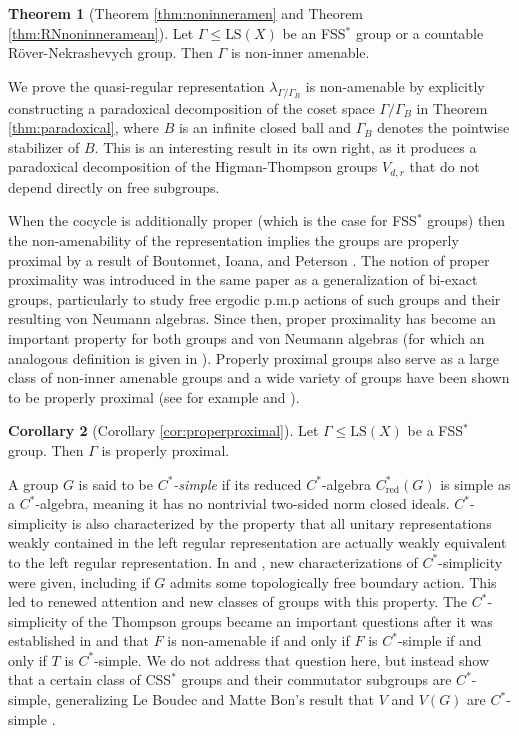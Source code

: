 \documentclass[12pt]{amsart}
\numberwithin{equation}{subsection}
\theoremstyle{definition}
\newtheorem{introthm}{Theorem}
\newtheorem{introcor}[introthm]{Corollary}
\theoremstyle{definition}
\theoremstyle{remark}
\begin{document}
 

\begin{introthm}[Theorem \ref{thm:noninneramen} and Theorem \ref{thm:RNnoninneramean}]\label{MainThm:NonInner}
    Let $\Gamma \leq \text{LS}(X)$ be an FSS$^*$ group or a countable R\"{o}ver-Nekrashevych group. Then $\Gamma$ is non-inner amenable.
\end{introthm}


We prove the quasi-regular representation $\lambda_{\Gamma / \Gamma_B}$ is non-amenable by explicitly constructing a paradoxical decomposition of the coset space $\Gamma/\Gamma_B$ in Theorem \ref{thm:paradoxical}, where $B$ is an infinite closed ball and $\Gamma_{B}$ denotes the pointwise stabilizer of $B$. This is an interesting result in its own right, as it produces a paradoxical decomposition of the Higman-Thompson groups $V_{d,r}$ that do not depend directly on free subgroups. 

When the cocycle is additionally proper (which is the case for FSS$^*$ groups) then the non-amenability of the representation implies the groups are properly proximal by a result of Boutonnet, Ioana, and Peterson \cite{boutonnet2021properly}. The notion of proper proximality was introduced in the same paper as a generalization of bi-exact groups, particularly to study free ergodic p.m.p actions of such groups and their resulting von Neumann algebras. Since then, proper proximality has become an important property for both groups and von Neumann algebras (for which an analogous definition is given in \cite{ding2022properly}). Properly proximal groups also serve as a large class of non-inner amenable groups and a wide variety of groups have been shown to be properly proximal (see for example \cite{ding2021ProperProximality} and \cite{horbez2023proper}). 



\begin{introcor}[Corollary \ref{cor:properproximal}]\label{MainThmPropP}
     Let $\Gamma \leq \text{LS}(X)$ be a FSS$^*$ group. Then $\Gamma$ is properly proximal.
\end{introcor}

A group $G$ is said to be \emph{$C^*$-simple} if its reduced $C^*$-algebra $C^*_{\text{red}}(G)$ is simple as a $C^*$-algebra, meaning it has no nontrivial two-sided norm closed ideals. $C^*$-simplicity is also characterized by the property that all unitary representations weakly contained in the left regular representation are actually weakly equivalent to the left regular representation. In \cite{KalantarKennedy2016} and \cite{BKKO2016UniqueTraceProp}, new characterizations of $C^*$-simplicity were given, including if $G$ admits some topologically free boundary action. This led to renewed attention and new classes of groups with this property. The $C^*$-simplicity of the Thompson groups became an important questions after it was established in \cite{HO2016} and \cite{LeBoudecBon2018} that $F$ is non-amenable if and only if $F$ is $C^*$-simple if and only if $T$ is $C^*$-simple. We do not address that question here, but instead show that a certain class of CSS$^*$ groups and their commutator subgroups are $C^*$-simple, generalizing Le Boudec and Matte Bon's result that $V$ and $V(G)$ are $C^*$-simple \cite{LeBoudecBon2018}.
\end{document}
